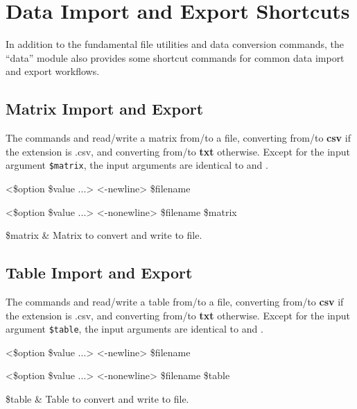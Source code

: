 \section{Data Import and Export Shortcuts}
In addition to the fundamental file utilities and data conversion commands, the ``data'' module also provides some shortcut commands for common data import and export workflows.
\subsection{Matrix Import and Export}
The commands  and  read/write a matrix from/to a file, converting from/to \textbf{csv} if the extension is .csv, and converting from/to \textbf{txt} otherwise.
Except for the input argument \texttt{\$matrix}, the input arguments are identical to  and .
\begin{syntax}
 <\$option \$value ...> <-newline> \$filename
\end{syntax}
\begin{syntax}
 <\$option \$value ...> <-nonewline> \$filename \$matrix
\end{syntax}
\begin{args}
\$matrix & Matrix to convert and write to file.
\end{args}
\subsection{Table Import and Export}
The commands  and  read/write a table from/to a file, converting from/to \textbf{csv} if the extension is .csv, and converting from/to \textbf{txt} otherwise.
Except for the input argument \texttt{\$table}, the input arguments are identical to  and .
\begin{syntax}
 <\$option \$value ...> <-newline> \$filename
\end{syntax}
\begin{syntax}
 <\$option \$value ...> <-nonewline> \$filename \$table
\end{syntax}
\begin{args}
\$table & Table to convert and write to file.
\end{args}
\clearpage





